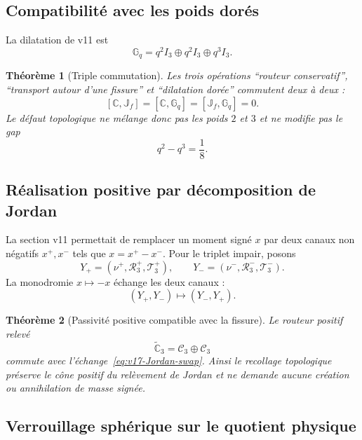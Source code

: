 \documentclass[11pt,a4paper]{article}
\newtheorem{theorem}{Théorème}[section]
\begin{document}
\subsection{Compatibilité avec les poids dorés}

La dilatation de v11 est
\[
 \mathbb G_q
 =q^2I_3\oplus q^2I_3\oplus q^3I_3.
\]

\begin{theorem}[Triple commutation]\label{thm:v17-triple-commutation}
Les trois opérations ``routeur conservatif'', ``transport autour d'une fissure'' et ``dilatation dorée'' commutent deux à deux :
\begin{equation}\label{eq:v17-triple-commutation}
 \boxed{
 [\mathbb C,\mathbb J_f]
 =[\mathbb C,\mathbb G_q]
 =[\mathbb J_f,\mathbb G_q]
 =0.}
\end{equation}
Le défaut topologique ne mélange donc pas les poids $2$ et $3$ et ne modifie pas le gap
\[
 q^2-q^3=\frac18.
\]
\end{theorem}

\subsection{Réalisation positive par décomposition de Jordan}

La section v11 permettait de remplacer un moment signé $x$ par deux canaux non négatifs $x^+,x^-$ tels que $x=x^+-x^-$. Pour le triplet impair, posons
\[
 Y_+=(\nu^+,\mathscr R_3^+,\mathscr T_3^+),
 \qquad
 Y_-=(\nu^-,\mathscr R_3^-,\mathscr T_3^-).
\]
La monodromie $x\mapsto-x$ échange les deux canaux :
\begin{equation}\label{eq:v17-Jordan-swap}
 \boxed{
 (Y_+,Y_-)\longmapsto(Y_-,Y_+).}
\end{equation}

\begin{theorem}[Passivité positive compatible avec la fissure]\label{thm:v17-positive-lift}
Le routeur positif relevé
\[
 \widetilde{\mathbb C}_3
 =\mathcal C_3\oplus\mathcal C_3
\]
commute avec l'échange~\eqref{eq:v17-Jordan-swap}. Ainsi le recollage topologique préserve le cône positif du relèvement de Jordan et ne demande aucune création ou annihilation de masse signée.
\end{theorem}

\subsection{Verrouillage sphérique sur le quotient physique}
\end{document}
